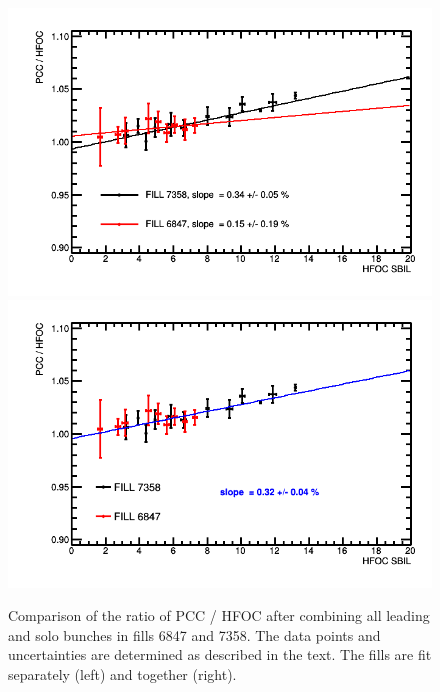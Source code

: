 \clearpage
\begin{figure}[t]
  \begin{center}
    \includegraphics[width=0.47\linewidth]{plots/sbilratios_singles_combined/compareFills_graph_fillstogether.png}
    \includegraphics[width=0.47\linewidth]{plots/sbilratios_singles_combined/compareFills_graph_fillstogether_onefit.png}
    \caption{
      Comparison of the ratio of PCC / HFOC after combining all leading and solo bunches in fills 6847 and 7358.
      The data points and uncertainties are determined as described in the text.
      The fills are fit separately (left) and together (right).
      \label{fig:sbilratiosresultscombined}
    }
  \end{center}
\end{figure}
